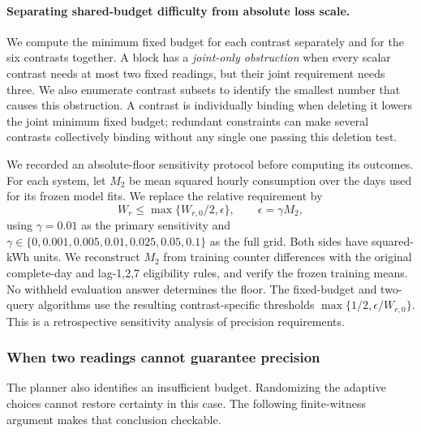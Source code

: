 \documentclass[12pt]{article}
\begin{document}
\paragraph{Separating shared-budget difficulty from absolute loss scale.}
We compute the minimum fixed budget for each contrast separately and for the
six contrasts together. A block has a \emph{joint-only obstruction} when every
scalar contrast needs at most two fixed readings, but their joint requirement
needs three. We also enumerate contrast subsets to identify the smallest
number that causes this obstruction. A contrast is individually binding when
deleting it lowers the joint minimum fixed budget; redundant constraints can
make several contrasts collectively binding without any single one passing
this deletion test.

We recorded an absolute-floor sensitivity protocol before computing its
outcomes. For each system, let $M_2$ be mean squared hourly consumption over
the days used for its frozen model fits. We replace the relative requirement
by
\[
 W_r\leq \max\{W_{r,0}/2,\epsilon\},\qquad \epsilon=\gamma M_2,
\]
using $\gamma=0.01$ as the primary sensitivity and
$\gamma\in\{0,0.001,0.005,0.01,0.025,0.05,0.1\}$ as the full grid.
Both sides have squared-kWh units. We reconstruct $M_2$ from training
counter differences with the original complete-day and lag-1,2,7 eligibility
rules, and verify the frozen training means. No withheld evaluation answer
determines the floor. The fixed-budget and two-query algorithms use the
resulting contrast-specific thresholds $\max\{1/2,\epsilon/W_{r,0}\}$.
This is a retrospective sensitivity analysis of precision requirements.

\subsubsection{When two readings cannot guarantee precision}
\label{sec:assurance-feasibility}
The planner also identifies an insufficient budget. Randomizing the
adaptive choices cannot restore certainty in this case. The following
finite-witness argument makes that conclusion checkable.
\end{document}
